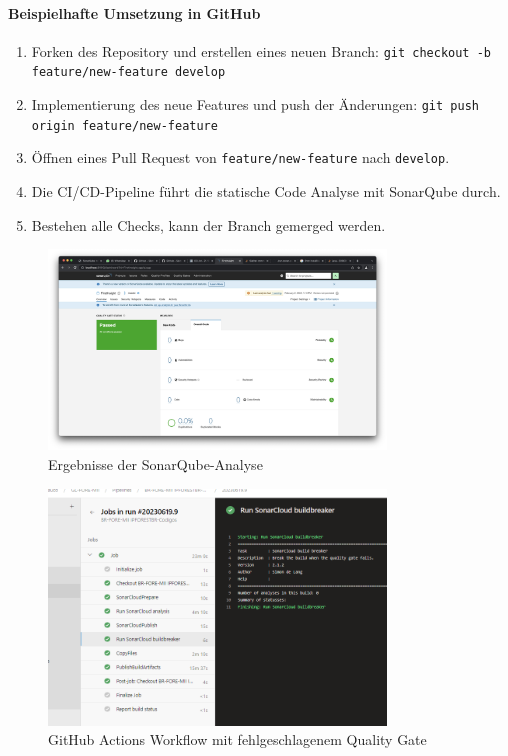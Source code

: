 \paragraph{Beispielhafte Umsetzung in GitHub}

\begin{enumerate}
    \item Forken des Repository und erstellen eines neuen Branch: \texttt{git checkout -b feature/new-feature develop}
    \item Implementierung des neue Features und push der Änderungen: \texttt{git push origin feature/new-feature}
    \item Öffnen eines Pull Request von \texttt{feature/new-feature} nach \texttt{develop}.
    \item Die CI/CD-Pipeline führt die statische Code Analyse mit SonarQube durch.
    \item Bestehen alle Checks, kann der Branch gemerged werden.
\end{enumerate}


\begin{figure}[h!]
\centering
\includegraphics[width=0.8\textwidth]{img/sonarqube_results.jpeg}
\caption{Ergebnisse der SonarQube-Analyse}
\label{fig:sonarqube_results}
\end{figure}

\begin{figure}[h!]
\centering
\includegraphics[width=0.8\textwidth]{img/github_actions_failed_quality_gate.png}
\caption{GitHub Actions Workflow mit fehlgeschlagenem Quality Gate}
\label{fig:github_actions_failed_quality_gate}
\end{figure}

